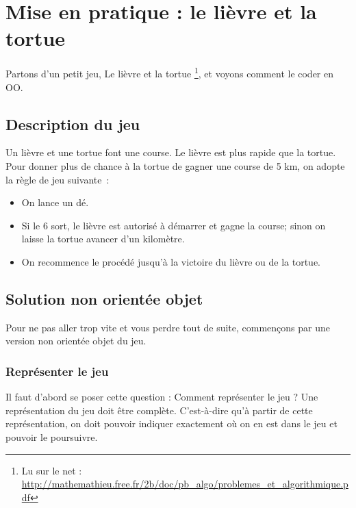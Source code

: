 \clearpage	
\section{Mise en pratique : le lièvre et la tortue}

	Partons d'un petit jeu, \og{}Le lièvre et la tortue\fg{}%
	\footnote{%
		Lu sur le net : 
		\url{http://mathemathieu.free.fr/2b/doc/pb_algo/problemes_et_algorithmique.pdf}
	}, 
	et voyons comment le coder en OO.

	\subsection{Description du jeu}
	
		Un lièvre et une tortue font une course.
		Le lièvre est plus rapide que la tortue.
		Pour donner plus de chance à la tortue de gagner une course de 5 km, 
		on adopte la règle de jeu suivante~:
		\begin{itemize}
		\item 
			On lance un dé. 
		\item
			Si le 6 sort, 
			le lièvre est autorisé à démarrer et gagne la course; 
			sinon on laisse la tortue avancer d’un kilomètre.
		\item
			On recommence le procédé jusqu'à la victoire du lièvre ou de la tortue.
		\end{itemize}
		
	\subsection{Solution non orientée objet}
	
		Pour ne pas aller trop vite et vous perdre tout de suite,
		commençons par une version non orientée objet du jeu.
		
		\subsubsection*{Représenter le jeu}

			Il faut d'abord se poser cette question :
			Comment représenter le jeu ?
			Une représentation du jeu doit être complète.
			C'est-à-dire qu'à partir de cette représentation,
			on doit pouvoir indiquer exactement où on en est dans le jeu
			et pouvoir le poursuivre.
			
